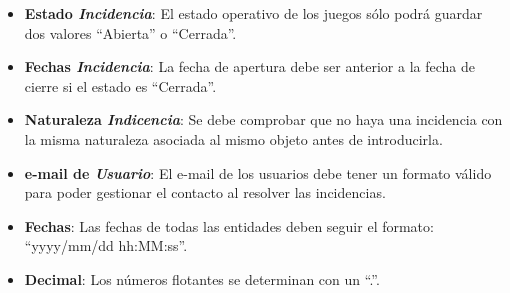 \documentclass[]{article}
\begin{document}
\begin{itemize}
    \item \textbf{Estado \textit{Incidencia}}: El estado operativo de los juegos sólo podrá guardar dos valores ``Abierta'' o ``Cerrada''.
    \item \textbf{Fechas \textit{Incidencia}}: La fecha de apertura debe ser anterior a la fecha de cierre si el estado es ``Cerrada''.
    \item \textbf{Naturaleza \textit{Indicencia}}: Se debe comprobar que no haya una incidencia con la misma naturaleza asociada al mismo objeto antes de introducirla.
    \item \textbf{e-mail de \textit{Usuario}}: El e-mail de los usuarios debe tener un formato válido para poder gestionar el contacto al resolver las incidencias.
    \item \textbf{Fechas}: Las fechas de todas las entidades deben seguir el formato: ``yyyy/mm/dd hh:MM:ss''.
    \item \textbf{Decimal}: Los números flotantes se determinan con un ``.''.
\end{itemize}
\end{document}
